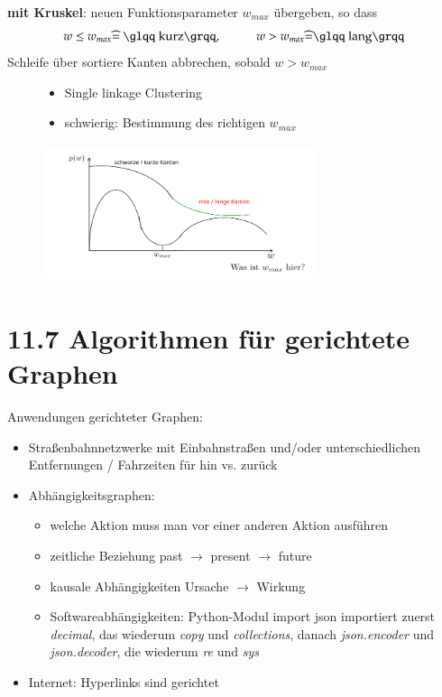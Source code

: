 \documentclass[11pt, fleqn]{scrreprt}
\begin{document}
	\textbf{mit Kruskel}: neuen Funktionsparameter $w_{max}$ übergeben, so dass 
	\[w \leq w_{max} \widehat{=}\text{ \glqq kurz\grqq},\hspace*{1cm} w > w_{max} \widehat{=} \text{\glqq lang\grqq} \]
	Schleife über sortiere Kanten abbrechen, sobald $w > w_{max}$ 
	\begin{figure}[htbp]
		\begin{minipage}{8cm}
			\vspace*{0mm}
			\begin{itemize}
				\item \glqq Single linkage Clustering\grqq
				\item schwierig: Bestimmung des richtigen $w_{max}$
			\end{itemize}
		\end{minipage}
		\begin{minipage}{8cm}
			\vspace*{0mm}
			\includegraphics[width=8cm,height=4cm,keepaspectratio]{./Pictures/wGraph.png}
		\end{minipage}
	\end{figure}
	
	
	\section*{11.7 Algorithmen für gerichtete Graphen}
	
	Anwendungen gerichteter Graphen:
	\begin{itemize}
		\item Straßenbahnnetzwerke mit Einbahnstraßen und/oder unterschiedlichen Entfernungen / Fahrzeiten für hin vs. zurück
		\item Abhängigkeitsgraphen:
		\begin{itemize}
			\item welche Aktion muss man vor einer anderen Aktion ausführen
			\item zeitliche Beziehung \hspace*{1cm}past $\rightarrow$ present $\rightarrow$ future
			\item kausale Abhängigkeiten \hspace*{0.1cm} Ursache $\rightarrow$ Wirkung
			\item Softwareabhängigkeiten: Python-Modul import json importiert zuerst \emph{decimal}, das wiederum \emph{copy} und \emph{collections}, danach \emph{json.encoder} und \emph{json.decoder}, die wiederum \emph{re} und \emph{sys}
		\end{itemize}
		\item Internet: Hyperlinks sind gerichtet
	\end{itemize}
	
\end{document}
